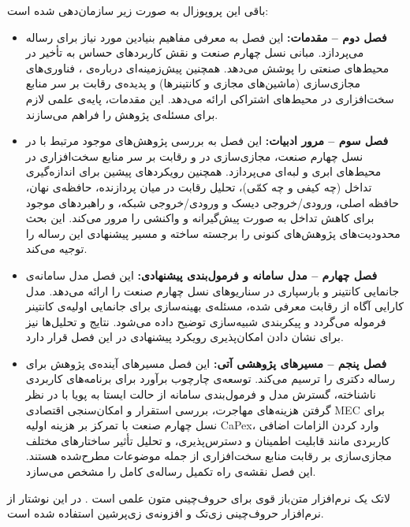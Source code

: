 باقی‌ این پروپوزال به صورت زیر سازمان‌دهی شده است:
\begin{itemize}
\item
\textbf{فصل دوم – مقدمات:}
این فصل به معرفی مفاهیم بنیادین مورد نیاز برای رساله می‌پردازد. مبانی نسل چهارم صنعت و نقش کاربردهای حساس به تأخیر در محیط‌های صنعتی را پوشش می‌دهد. همچنین پیش‌زمینه‌ای درباره‌ی ، فناوری‌های مجازی‌سازی (ماشین‌های مجازی و کانتینرها) و پدیده‌ی رقابت بر سر منابع سخت‌افزاری در محیط‌های اشتراکی ارائه می‌دهد. این مقدمات، پایه‌ی علمی لازم برای مسئله‌ی پژوهش را فراهم می‌سازند.

\item
\textbf{فصل سوم – مرور ادبیات:}
این فصل به بررسی پژوهش‌های موجود مرتبط با  در نسل چهارم صنعت، مجازی‌سازی در  و رقابت بر سر منابع سخت‌افزاری در محیط‌های ابری و لبه‌ای می‌پردازد. همچنین رویکردهای پیشین برای اندازه‌گیری تداخل (چه کیفی و چه کمّی)، تحلیل رقابت در میان پردازنده، حافظه‌ی نهان، حافظه اصلی، ورودی/خروجی دیسک و ورودی/خروجی شبکه، و راهبردهای موجود برای کاهش تداخل به صورت پیش‌گیرانه و واکنشی را مرور می‌کند. این بحث محدودیت‌های پژوهش‌های کنونی را برجسته ساخته و مسیر پیشنهادی این رساله را توجیه می‌کند.

\item
\textbf{فصل چهارم – مدل سامانه و فرمول‌بندی پیشنهادی:}
این فصل مدل سامانه‌ی جانمایی کانتینر و بارسپاری در سناریوهای  نسل چهارم صنعت را ارائه می‌دهد. مدل کارایی آگاه از رقابت معرفی شده، مسئله‌ی بهینه‌سازی برای جانمایی اولیه‌ی کانتینر فرموله می‌گردد و پیکربندی شبیه‌سازی توضیح داده می‌شود. نتایج و تحلیل‌ها نیز برای نشان دادن امکان‌پذیری رویکرد پیشنهادی در این فصل قرار دارد.

\item
\textbf{فصل پنجم – مسیرهای پژوهشی آتی:}
این فصل مسیرهای آینده‌ی پژوهش برای رساله دکتری را ترسیم می‌کند. توسعه‌ی چارچوب برآورد برای برنامه‌های کاربردی ناشناخته، گسترش مدل و فرمول‌بندی سامانه از حالت ایستا به پویا با در نظر گرفتن هزینه‌های مهاجرت، بررسی استقرار و امکان‌سنجی اقتصادی MEC برای نسل چهارم صنعت با تمرکز بر هزینه اولیه CaPex، وارد کردن الزامات اضافی کاربردی مانند قابلیت اطمینان و دسترس‌پذیری، و تحلیل تأثیر ساختارهای مختلف مجازی‌سازی بر رقابت منابع سخت‌افزاری از جمله موضوعات مطرح‌شده هستند. این فصل نقشه‌ی راه تکمیل رساله‌ی کامل را مشخص می‌سازد.

\end{itemize}

لاتک\LTRfootnote{\LaTeX} یک نرم‌افزار متن‌باز قوی برای حروف‌چینی متون علمی است \cite
{knuth1984texbook, lamport1985LaTeX}.
در این نوشتار از نرم‌افزار حروف‌چینی زی‌تک\LTRfootnote{\XeTeX} 
و افزونه‌ی زی‌پرشین\LTRfootnote{\XePersian}
استفاده شده است.
